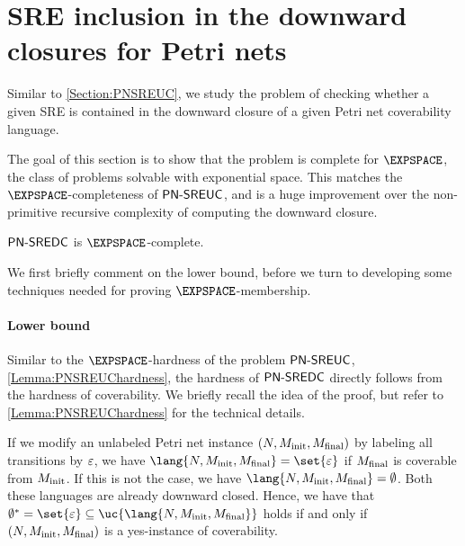 \documentclass[../../diss.tex]{subfiles}
\begin{document}
\section{SRE inclusion in the downward closures for Petri nets}%
\label{Section:PNSREDC}%

Similar to \cref{Section:PNSREUC}, we study the problem of checking whether a given SRE is contained in the downward closure of a given Petri net coverability language.

\begin{problem}
    \problemshort{($\SREDC$)}
\end{problem}

The goal of this section is to show that the problem is complete for $\EXPSPACE$, the class of problems solvable with exponential space.
This matches the $\EXPSPACE$-completeness of $\mathsf{PN\text{-}SREUC}$, and is a huge improvement over the non-primitive recursive complexity of computing the downward closure.

\begin{theorem}%
\label{Theorem:PNSREDC}%
    $\SREDC$ is $\EXPSPACE$-complete.
\end{theorem}

We first briefly comment on the lower bound, before we turn to developing some techniques needed for proving $\EXPSPACE$-membership.

\paragraph{Lower bound}

Similar to the $\EXPSPACE$-hardness of the problem $\mathsf{PN\text{-}SREUC}$, \cref{Lemma:PNSREUChardness}, the hardness of $\SREDC$ directly follows from the hardness of coverability.
We briefly recall the idea of the proof, but refer to \cref{Lemma:PNSREUChardness} for the technical details.

If we modify an unlabeled Petri net instance $(N,M_{\text{init}},M_{\text{final}})$ by labeling all transitions by $\varepsilon$, we have $\lang{N,\Minit,\Mfinal} = \set{\eps}$ if $M_{\text{final}}$ is coverable from $M_{\text{init}}$.
If this is not the case, we have $\lang{N,\Minit,\Mfinal} = \emptyset$.
Both these languages are already downward closed.
Hence, we have that $\emptyset^* = \set{\eps} \subseteq \uc{\lang{N,\Minit,\Mfinal}}$ holds if and only if $(N,M_{\text{init}},M_{\text{final}})$ is a yes-instance of coverability.
\end{document}
